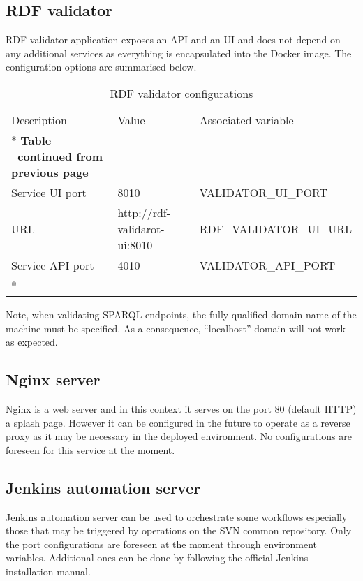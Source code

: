 	
	\subsection{RDF validator}
	
	RDF validator application exposes an API and an UI and does not depend on any additional services as everything is encapsulated into the Docker image. The configuration options are summarised below. 
	
	\begin{longtable}[c]{@{}p{4cm}p{5cm}l@{}}
		\toprule
		Description & Value & Associated variable \\* \midrule
		\endfirsthead
		\multicolumn{3}{c}%
		{{\bfseries Table \thetable\ continued from previous page}} \\
		\endhead
		\bottomrule
		\endfoot
		\endlastfoot
		Service UI port & 8010 & VALIDATOR\_UI\_PORT \\
		URL & http://rdf-validarot-ui:8010 & RDF\_VALIDATOR\_UI\_URL \\
		Service API port & 4010 & VALIDATOR\_API\_PORT \\* \bottomrule
		\caption{RDF validator configurations}
		\label{tab:my-table3}\\
	\end{longtable}

	Note, when validating SPARQL endpoints, the fully qualified domain name of the machine must be specified. As a consequence, ``localhost'' domain will not work as expected.

	\subsection{Nginx server}
	
	Nginx is a web server and in this context it serves on the port 80 (default HTTP) a splash page. However it can be configured in the future to operate as a reverse proxy as it may be necessary in the deployed environment. No configurations are foreseen for this service at the moment. 
	
	\subsection{Jenkins automation server}
	
	Jenkins automation server can be used to orchestrate some workflows especially those that may be triggered by operations on the SVN common repository. Only the port configurations are foreseen at the moment through environment variables. Additional ones can be done by following the official Jenkins installation manual. 
	
